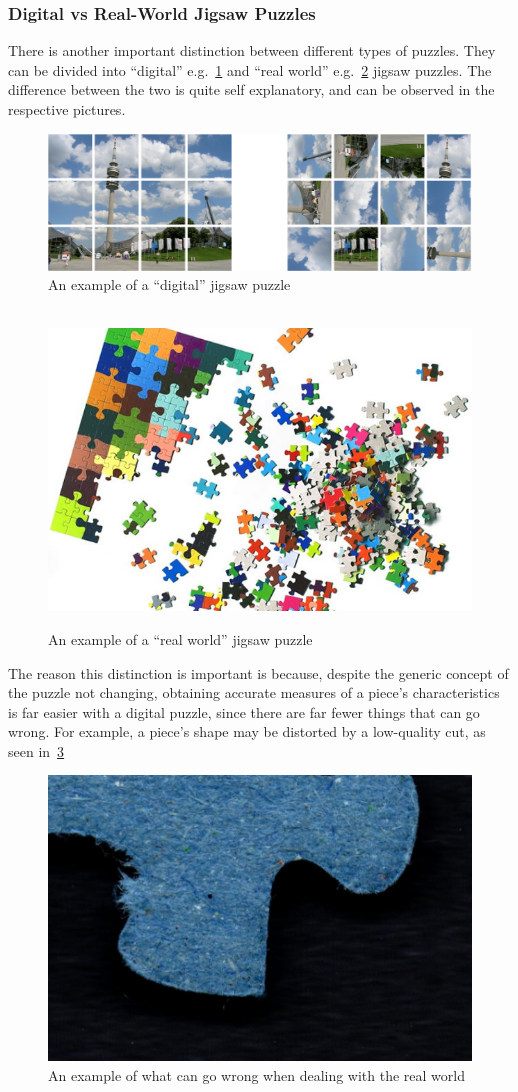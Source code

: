 \documentclass{article}
\begin{document}
\subsubsection{Digital vs Real-World Jigsaw Puzzles}

There is  another important distinction between different types of puzzles.
They can be divided into “digital” e.g.~\cref{fig:figure_digital_puzzle} and
“real world” e.g.~\cref{fig:figure_real_puzzle} jigsaw puzzles.
The difference between the two is quite self explanatory,
and can be observed in the respective pictures.
\label{document:DigitalVSReal}

\begin{figure}[H]
    \caption{An example of a “digital” jigsaw  puzzle}\label{fig:figure_digital_puzzle}
    \centering
    \includegraphics[height=0.25\textwidth]{pictures/digital_puzzle.png}
\end{figure}

\begin{figure}[H]
    \caption{An example of a ``real world'' jigsaw  puzzle}~\label{fig:figure_real_puzzle}
    \includegraphics[height=0.25\textwidth]{pictures/real_puzzle.jpg}
    \centering

\end{figure}

The reason this distinction is important is because,
despite the generic concept of the puzzle not changing,
obtaining accurate measures of a piece's characteristics
is far easier with a digital puzzle,
since there are far fewer things that can go wrong.
For example, a piece's shape may be distorted by
a low-quality cut, as seen in~\cref{fig:figure_measurement_error}

\begin{figure}[H]
    \caption{An example of what can go wrong when dealing with the real world}\label{fig:figure_measurement_error}
    \includegraphics[height=0.25\textwidth]{pictures/example_bad_piece.jpg}
    \centering
\end{figure}
\end{document}
